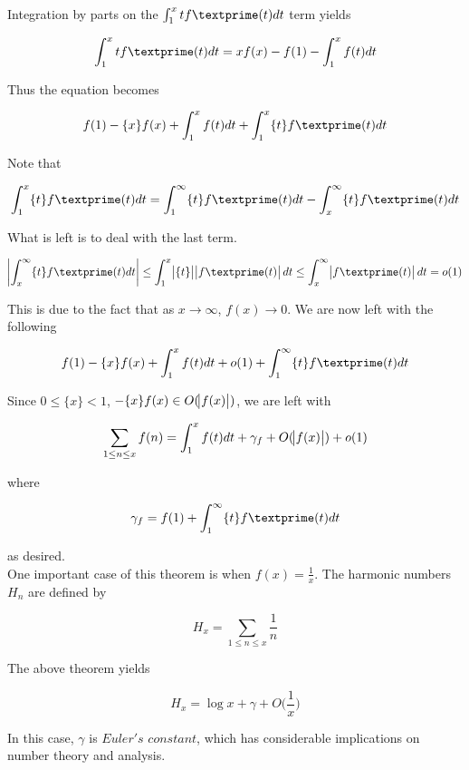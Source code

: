 \documentclass{article}
\begin{document}
Integration by parts on the $\int_{1}^x t f\textprime (t) dt$ term yields

\begin{equation*}
    \int_{1}^x t f\textprime (t) dt = xf(x) -f(1) - \int_{1}^x f(t) dt
\end{equation*}

Thus the equation becomes 

\begin{equation*}
    f(1) -\{x\} f(x) + \int_{1}^x f(t) dt + \int_{1}^x \{t\} f\textprime (t) dt 
\end{equation*}


Note that 

\begin{equation*}
    \int_{1}^x \{t\} f\textprime (t) dt = \int_{1}^\infty \{t\} f\textprime (t) dt - \int_{x}^\infty \{t\} f\textprime (t) dt 
\end{equation*}


What is left is to deal with the last term. 

\begin{equation*}
    \abs{\int_{x}^\infty \{t\} f\textprime (t) dt} \leq \int_{1}^x \abs{\{t\}} \abs{f\textprime (t)} dt \leq
    \int_{x}^\infty \abs{f\textprime (t)} dt = o(1) 
\end{equation*}

This is due to the fact that as $x \rightarrow \infty$, $f(x) \rightarrow 0$. We are now left with the following 

\begin{equation*}
    f(1) -\{x\} f(x) + \int_{1}^x f(t) dt + o(1) + \int_{1}^\infty \{t\} f\textprime (t) dt
\end{equation*}

Since $0 \leq \{x\} < 1$, $-\{x\} f(x) \in O(\abs{f(x)})$, we are left with 

\begin{equation*}
    \sum_{1\leq n \leq x} f(n) = \int_{1}^x f(t) dt + \gamma_f + O(\abs{f(x)}) + o(1)
\end{equation*}

where 

\begin{equation*}
    \gamma_f = f(1) + \int_{1}^\infty \{t\}f\textprime (t) dt
\end{equation*}

as desired. \\

One important case of this theorem is when $f(x) = \frac{1}{x}$. The harmonic numbers $H_n$ are defined by 

\begin{equation}
    H_x = \sum_{1 \leq n \leq x} \frac{1}{n}
\end{equation}

The above theorem yields 

\begin{equation*}
    H_x = \log x + \gamma + O\bigg(\frac{1}{x}\bigg)
\end{equation*}

In this case, $\gamma$ is $Euler's$ $constant$, which has considerable implications on number theory and analysis.
\end{document}
